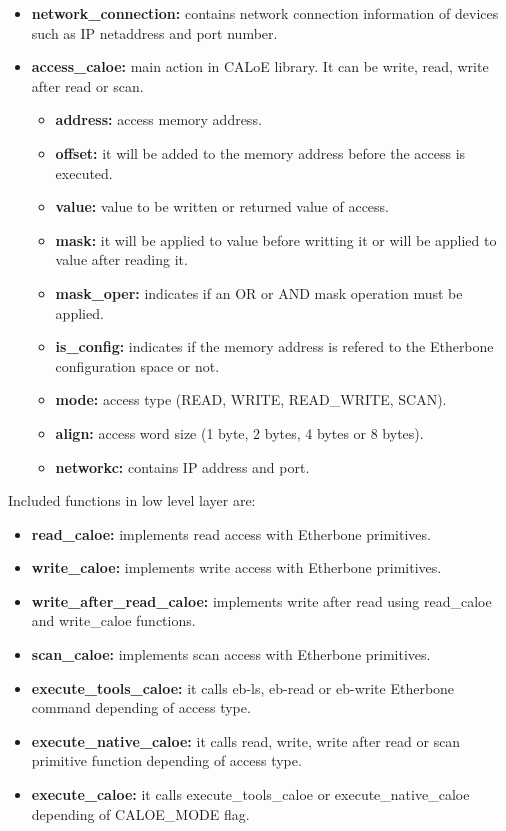 \begin{itemize}
\item{\textbf{network\_connection:} contains network connection information of devices such as IP netaddress and port number.}
\item{\textbf{access\_caloe:} main action in CALoE library. It can be write, read, write after read or scan.}
\begin{itemize}
\item{\textbf{address:} access memory address.}
\item{\textbf{offset:} it will be added to the memory address before the access is executed.}
\item{\textbf{value:} value to be written or returned value of access.}
\item{\textbf{mask:} it will be applied to value before writting it or will be applied to value after reading it.}
\item{\textbf{mask\_oper:} indicates if an OR or AND mask operation must be applied.}
\item{\textbf{is\_config:} indicates if the memory address is refered to the Etherbone configuration space or not.}
\item{\textbf{mode:} access type (READ, WRITE, READ\_WRITE, SCAN).}
\item{\textbf{align:} access word size (1 byte, 2 bytes, 4 bytes or 8 bytes).}
\item{\textbf{networkc:} contains IP address and port.}
\end{itemize}
\end{itemize}

Included functions in low level layer are:

\begin{itemize}
\item{\textbf{read\_caloe:} implements read access with Etherbone primitives.}
\item{\textbf{write\_caloe:} implements write access with Etherbone primitives.}
\item{\textbf{write\_after\_read\_caloe:} implements write after read using read\_caloe and write\_caloe functions.}
\item{\textbf{scan\_caloe:} implements scan access with Etherbone primitives.}
\item{\textbf{execute\_tools\_caloe:} it calls eb-ls, eb-read or eb-write Etherbone command depending of access type.}
\item{\textbf{execute\_native\_caloe:} it calls read, write, write after read or scan primitive function depending of access type.}
\item{\textbf{execute\_caloe:} it calls execute\_tools\_caloe or execute\_native\_caloe depending of CALOE\_MODE flag.}
\end{itemize}

